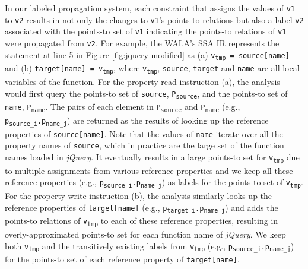 In our labeled propagation system, each constraint that assigns the values of {\tt v1} to {\tt v2} results in not only the changes to {\tt v1}'s points-to relations but also a label {\tt v2} associated with the points-to set of {\tt v1} indicating the points-to relations of {\tt v1} were propagated from {\tt v2}. For example, the WALA's SSA IR represents the statement at line 5 in Figure \ref{fig:jquery-modified} as (a) {\tt v\textsubscript{tmp} = source[name]} and (b) {\tt target[name] = v\textsubscript{tmp}}, where {\tt v\textsubscript{tmp}}, {\tt source}, {\tt target} and {\tt name} are all local variables of the function.  For the property read instruction (a), the analysis would first query the points-to set of {\tt source}, {\tt P\textsubscript{source}}, and the points-to set of {\tt name}, {\tt P\textsubscript{name}}. The pairs of each element in {\tt P\textsubscript{source}} and {\tt P\textsubscript{name}} (e.g., {\tt p\textsubscript{source\_i}.p\textsubscript{name\_j}}) are returned as the results of looking up the reference properties of {\tt source[name]}. Note that the values of {\tt name} iterate over all the property names of {\tt source}, which in practice are the large set of the function names loaded in {\it jQuery}. It eventually results in a large points-to set for {\tt v\textsubscript{tmp}} due to multiple assignments from various reference properties and we keep all these reference properties (e.g., {\tt p\textsubscript{source\_i}.p\textsubscript{name\_j}}) as labels for the points-to set of {\tt v\textsubscript{tmp}}. For the property write instruction (b), the analysis similarly looks up the reference properties of {\tt target[name]} (e.g., {\tt p\textsubscript{target\_i}.p\textsubscript{name\_j}}) and adds the points-to relations of {\tt v\textsubscript{tmp}} to each of these reference properties, resulting in overly-approximated points-to set for each function name of {\it jQuery}. We keep both {\tt v\textsubscript{tmp}} and the transitively existing labels from {\tt v\textsubscript{tmp}} (e.g., {\tt p\textsubscript{source\_i}.p\textsubscript{name\_j}}) for the points-to set of each reference property of {\tt target[name]}.

